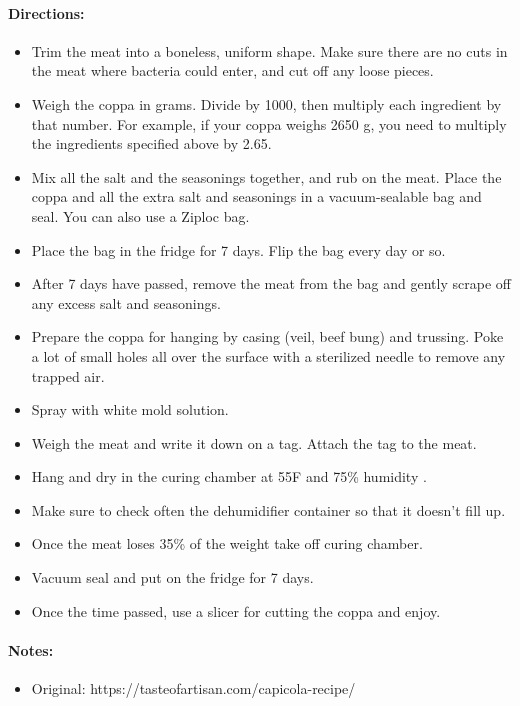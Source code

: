 \documentclass{article}
\begin{document}
\paragraph{Directions:}
\begin{itemize}
    \item Trim the meat into a boneless, uniform shape. Make sure there are no cuts in the meat where bacteria could enter, and cut off any loose pieces.
    \item Weigh the coppa in grams. Divide by 1000, then multiply each ingredient by that number. For example, if your coppa weighs 2650 g, you need to multiply the ingredients specified above by 2.65.
    \item Mix all the salt and the seasonings together, and rub on the meat. Place the coppa and all the extra salt and seasonings in a vacuum-sealable bag and seal. You can also use a Ziploc bag.
    \item Place the bag in the fridge for 7 days. Flip the bag every day or so.
    \item After 7 days have passed, remove the meat from the bag and gently scrape off any excess salt and seasonings.
    \item Prepare the coppa for hanging by casing (veil, beef bung) and trussing. Poke a lot of small holes all over the surface with a sterilized needle to remove any trapped air.
    \item Spray with white mold solution.
    \item Weigh the meat and write it down on a tag. Attach the tag to the meat.
    \item Hang and dry in the curing chamber at 55F and 75\% humidity .
    \item Make sure to check often the dehumidifier container so that it doesn't fill up.
    \item Once the meat loses 35\% of the weight take off curing chamber.
    \item Vacuum seal and put on the fridge for 7 days.
    \item Once the time passed, use a slicer for cutting the coppa and enjoy.
\end{itemize}

\paragraph{Notes:}
\begin{itemize}
    \item Original: https://tasteofartisan.com/capicola-recipe/
\end{itemize}
\end{document}
